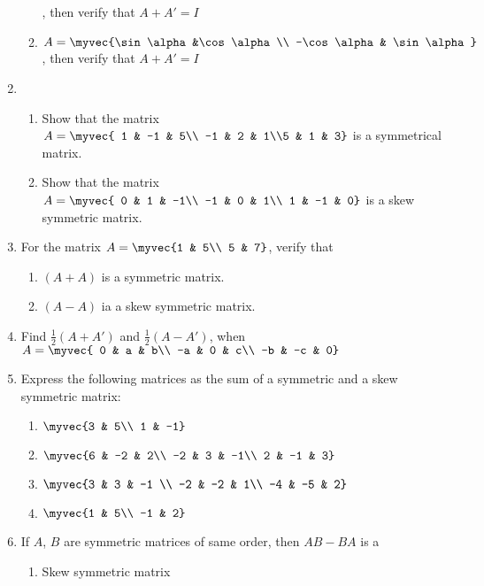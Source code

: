 \begin{enumerate}
\begin{enumerate}[label=(\roman*)]
, then verify that $A+A'=I$
\item $A=\myvec{\sin \alpha &\cos \alpha \\ -\cos  \alpha & \sin \alpha}$
, then verify that $A+A'=I$
\end{enumerate}
\item
\begin{enumerate}[label=(\roman*)]
\item Show that the matrix $A=\myvec{ 1 & -1 & 5\\ -1 & 2 & 1\\5 & 1 & 3} $ is a symmetrical matrix.
\item Show that the matrix $A=\myvec{ 0 &  1 & -1\\ -1 & 0 & 1\\ 1 & -1 & 0} $ is a skew symmetric matrix.
\end{enumerate} 
\item For the matrix $A=\myvec {1 & 5\\ 5 & 7}$, verify that
\begin{enumerate}[label=(\roman*)]
\item $(A+A)$ is a symmetric matrix.
\item $(A-A)$ ia a skew symmetric matrix.
\end{enumerate}
\item Find $\frac{1}{2} (A+A')$ and $\frac{1}{2} (A-A')$,
when $A=\myvec{ 0 & a & b\\ -a & 0 & c\\ -b & -c & 0}$
\item Express the following matrices as the sum of a symmetric and a skew symmetric matrix:
\begin{enumerate}[label=(\roman*)]
\item $\myvec{3 & 5\\ 1 & -1}$
\item $\myvec{6 & -2 & 2\\ -2 & 3 & -1\\ 2 & -1 & 3}$
\item $\myvec{3 & 3 & -1 \\ -2 & -2 & 1\\ -4 & -5 & 2}$
\item $\myvec{1 & 5\\ -1 & 2}$
\end{enumerate}
\item If $A$, $B$ are symmetric matrices of same order, then $AB-BA$ is a
\begin{enumerate}
\item Skew symmetric matrix

\end{enumerate}
\end{enumerate}
